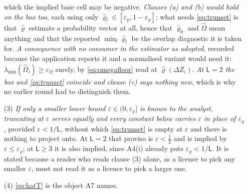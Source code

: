 \begin{remark}
\begin{enumerate}
which the implied base cell may be negative. \emph{Clauses \textup{(a)} and \textup{(b)} would hold on
the box too}, each using only $\hat\varrho_l\in[\varepsilon_\varrho,1-\varepsilon_\varrho]$; what needs
\eqref{eq:trunset} is that $\hat\varrho$ estimate a probability vector at all, hence that $\hat\varrho_0$
and $\hat\Omega$ mean anything and that the reported $\min_l\hat\varrho_l$ be the overlap diagnostic it
is taken for. \emph{A consequence with no consumer in the estimator as adopted}, recorded because the
application reports it and a normalised variant would need it:
$\lambda_{\min}(\hat\Omega_i)\ge\varepsilon_\Omega$ surely, by \eqref{eq:omegafloor} read at
$\hat\varrho(\Delta Z_i)$. \emph{At $\mathsf L=2$ the box and \eqref{eq:trunset} coincide and clause
\textup{(c)} says nothing new}, which is why no earlier round had to distinguish them.
\item[(3)] \emph{If only a smaller lower bound $\varepsilon\in(0,\varepsilon_\varrho]$ is known
to the analyst, truncating at $\varepsilon$ serves equally and every constant below carries
$\varepsilon$ in place of $\varepsilon_\varrho$}, provided $\varepsilon<1/\mathsf L$, without
which \eqref{eq:trunset} is empty at $\varepsilon$ and there is nothing to project onto. At
$\mathsf L=2$ that proviso is $\varepsilon<\tfrac12$ and is implied by
$\varepsilon\le\varepsilon_\varrho$; at $\mathsf L\ge3$ it is also implied, since A4(i) already puts
$\varepsilon_\varrho<1/\mathsf L$. It is stated because a reader who reads clause \textup{(3)} alone,
as a licence to pick any smaller $\varepsilon$, must not read it as a licence to pick a larger one.
\item[(4)] \eqref{eq:hatT} is the object A7 names.
\end{enumerate}
\end{remark}

